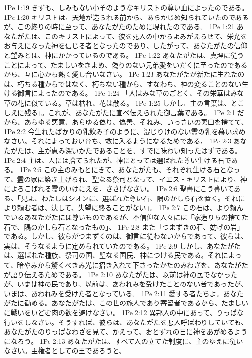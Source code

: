 1Pe 1:19  きずも、しみもない小羊のようなキリストの尊い血によったのである。
1Pe 1:20  キリストは、天地が造られる前から、あらかじめ知られていたのであるが、この終りの時に至って、あなたがたのために現れたのである。
1Pe 1:21  あなたがたは、このキリストによって、彼を死人の中からよみがえらせて、栄光をお与えになった神を信じる者となったのであり、したがって、あなたがたの信仰と望みとは、神にかかっているのである。
1Pe 1:22  あなたがたは、真理に従うことによって、たましいをきよめ、偽りのない兄弟愛をいだくに至ったのであるから、互に心から熱く愛し合いなさい。
1Pe 1:23  あなたがたが新たに生れたのは、朽ちる種からではなく、朽ちない種から、すなわち、神の変ることのない生ける御言によったのである。
1Pe 1:24  「人はみな草のごとく、その栄華はみな草の花に似ている。草は枯れ、花は散る。
1Pe 1:25  しかし、主の言葉は、とこしえに残る」。これが、あなたがたに宣べ伝えられた御言葉である。
1Pe 2:1  だから、あらゆる悪意、あらゆる偽り、偽善、そねみ、いっさいの悪口を捨てて、
1Pe 2:2  今生れたばかりの乳飲み子のように、混じりけのない霊の乳を慕い求めなさい。それによっておい育ち、救に入るようになるためである。
1Pe 2:3  あなたがたは、主が恵み深いかたであることを、すでに味わい知ったはずである。
1Pe 2:4  主は、人には捨てられたが、神にとっては選ばれた尊い生ける石である。
1Pe 2:5  この主のみもとにきて、あなたがたも、それぞれ生ける石となって、霊の家に築き上げられ、聖なる祭司となって、イエス・キリストにより、神によろこばれる霊のいけにえを、ささげなさい。
1Pe 2:6  聖書にこう書いてある、「見よ、わたしはシオンに、選ばれた尊い石、隅のかしら石を置く。それにより頼む者は、決して、失望に終ることがない」。
1Pe 2:7  この石は、より頼んでいるあなたがたには尊いものであるが、不信仰な人々には「家造りらの捨てた石で、隅のかしら石となったもの」、
1Pe 2:8  また「つまずきの石、妨げの岩」である。しかし、彼らがつまずくのは、御言に従わないからであって、彼らは、実は、そうなるように定められていたのである。
1Pe 2:9  しかし、あなたがたは、選ばれた種族、祭司の国、聖なる国民、神につける民である。それによって、暗やみから驚くべきみ光に招き入れて下さったかたのみわざを、あなたがたが語り伝えるためである。
1Pe 2:10  あなたがたは、以前は神の民でなかったが、いまは神の民であり、以前は、あわれみを受けたことのない者であったが、いまは、あわれみを受けた者となっている。
1Pe 2:11  愛する者たちよ。あなたがたに勧める。あなたがたは、この世の旅人であり寄留者であるから、たましいに戦いをいどむ肉の欲を避けなさい。
1Pe 2:12  異邦人の中にあって、りっぱな行いをしなさい。そうすれば、彼らは、あなたがたを悪人呼ばわりしていても、あなたがたのりっぱなわざを見て、かえって、おとずれの日に神をあがめるようになろう。
1Pe 2:13  あなたがたは、すべて人の立てた制度に、主のゆえに従いなさい。主権者としての王であろうと、
